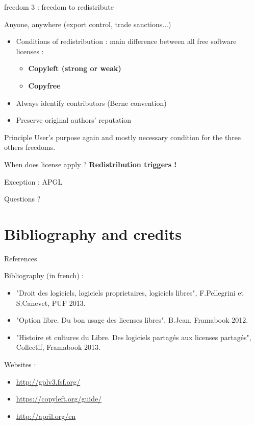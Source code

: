 \documentclass{beamer}
\begin{document}
\begin{frame}{freedom 3 : freedom to redistribute}

Anyone, anywhere (export control, trade sanctions...)

  \begin{itemize}
  \item Conditions of redistribution : main difference between all free software licenses :
    \begin{itemize}
    \item \textbf{Copyleft (strong or weak)}
    \item \textbf{Copyfree}
    \end{itemize}
  \item Always identify contributors (Berne convention)
  \item Preserve original authors' reputation
  \end{itemize}
\begin{alertblock}{Principle}
    User's purpose again and mostly necessary condition for the three others freedoms.
  \end{alertblock}

\begin{alertblock}{When does license apply ?}
\textbf{Redistribution triggers !}
 \end{alertblock}
 
 Exception : APGL 
\end{frame}

\begin{frame}
  Questions ?
\end{frame}

\section{Bibliography and credits}

\begin{frame}{References}

Bibliography (in french) :

  \begin{itemize}
  \item "Droit des logiciels, logiciels proprietaires, logiciels libres", F.Pellegrini et S.Canevet, PUF 2013.
  \item "Option libre. Du bon usage des licenses libres", B.Jean, Framabook 2012.
  \item "Histoire et cultures du Libre. Des logiciels partagés aux licenses partagés", Collectif, Framabook 2013.
  \end{itemize}

Websites :

\begin{itemize}
\item \url{http://gplv3.fsf.org/}
\item \url{https://copyleft.org/guide/}
\item \url{http://april.org/en}
\end{itemize}
  
\end{frame}
\end{document}
